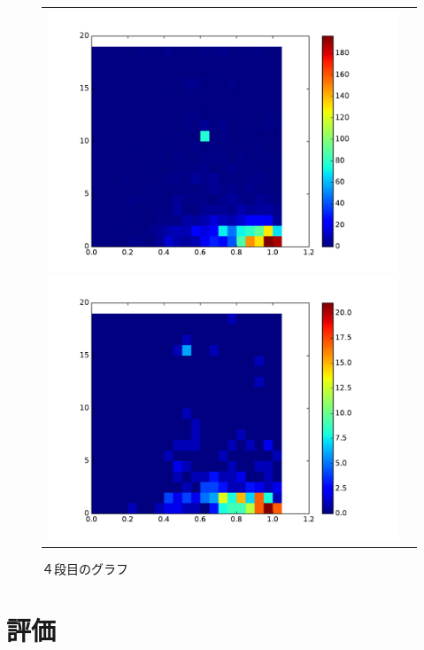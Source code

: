 \documentclass[a4paper,10pt,onecolumn,oneside,openany]{jsbook}
\begin{document}
\begin{figure}[h]
\begin{tabular}{cc}
 	\begin{minipage}[t]{0.45\hsize}
	 \centering
	 \includegraphics[keepaspectratio, scale = 0.35]{colormap_splite_3.pdf}
	 \caption{３段目のグラフ}
	 \label{third_block}
	\end{minipage}
        \begin{minipage}[t]{0.45\hsize}
	 \centering
	 \includegraphics[keepaspectratio, scale = 0.35]{colormap_splite_4.pdf}
	 \caption{４段目のグラフ}
	 \label{fourth_block}
	\end{minipage}
 \end{tabular}
 \end{figure}

\chapter{評価}
\end{document}
